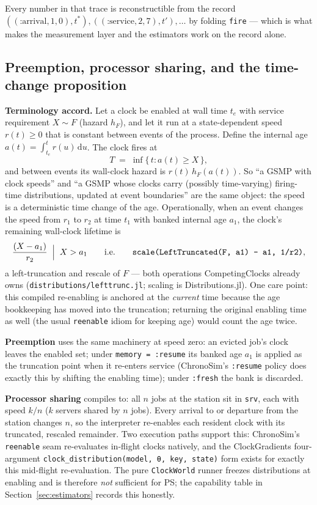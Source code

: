 \documentclass[11pt]{article}
\newcommand{\dd}{\mathrm{d}}
\newcommand{\code}[1]{\texttt{#1}}
\begin{document}
Every number in that trace is reconstructible from the record
$((\text{:arrival},1,0), t^\ast), ((\text{:service},2,7), t'), \ldots$ by
folding \code{fire} --- which is what makes the measurement layer and the
estimators work on the record alone.

\subsection{Preemption, processor sharing, and the time-change proposition}
\label{sec:timechange}

\textbf{Terminology accord.} Let a clock be enabled at wall time $t_e$ with
service requirement $X \sim F$ (hazard $h_F$), and let it run at a
state-dependent speed $r(t) \ge 0$ that is constant between events of the
process. Define the internal age $a(t) = \int_{t_e}^{t} r(u)\,\dd u$. The
clock fires at
\[
T \;=\; \inf\{\, t : a(t) \ge X \,\},
\]
and between events its wall-clock hazard is $r(t)\, h_F(a(t))$. So ``a GSMP
with clock speeds'' and ``a GSMP whose clocks carry (possibly time-varying)
firing-time distributions, updated at event boundaries'' are the same object:
the speed is a deterministic time change of the age. Operationally, when an
event changes the speed from $r_1$ to $r_2$ at time $t_1$ with banked internal
age $a_1$, the clock's remaining wall-clock lifetime is
\[
\frac{(X - a_1)}{r_2} \;\Bigm|\; X > a_1
\qquad\text{i.e.}\qquad
\code{scale(LeftTruncated(F, a1) - a1, 1/r2)},
\]
a left-truncation and rescale of $F$ --- both operations CompetingClocks
already owns (\code{distributions/lefttrunc.jl}; scaling is
Distributions.jl). One care point: this compiled re-enabling is anchored at
the \emph{current} time because the age bookkeeping has moved into the
truncation; returning the original enabling time as well (the usual
\code{reenable} idiom for keeping age) would count the age twice.

\textbf{Preemption} uses the same machinery at speed zero: an evicted job's
clock leaves the enabled set; under \code{memory = :resume} its banked age
$a_1$ is applied as the truncation point when it re-enters service
(ChronoSim's \code{:resume} policy does exactly this by shifting the enabling
time); under \code{:fresh} the bank is discarded.

\textbf{Processor sharing} compiles to: all $n$ jobs at the station sit in
\code{srv}, each with speed $k/n$ ($k$ servers shared by $n$ jobs). Every
arrival to or departure from the station changes $n$, so the interpreter
re-enables each resident clock with its truncated, rescaled remainder. Two
execution paths support this: ChronoSim's \code{reenable} seam re-evaluates
in-flight clocks natively, and the ClockGradients four-argument
\code{clock\_distribution(model, θ, key, state)} form exists for exactly this
mid-flight re-evaluation. The pure \code{ClockWorld} runner freezes
distributions at enabling and is therefore \emph{not} sufficient for PS; the
capability table in Section~\ref{sec:estimators} records this honestly.
\end{document}
